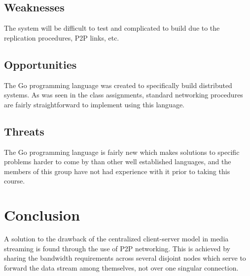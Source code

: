 \documentclass[fleqn,24pt]{SelfArx} %
\begin{document}
\subsection{Weaknesses}
The system will be difficult to test and complicated to build due to the replication procedures, P2P links, etc.

\subsection{Opportunities}
The Go programming language was created to specifically build distributed systems. As was seen in the class assignments, standard networking procedures are fairly straightforward to implement using this language. 

\subsection{Threats}
The Go programming language is fairly new which makes solutions to specific problems harder to come by than other well established languages, and the members of this group have not had experience with it prior to taking this course. 

\section{Conclusion}

A solution to the drawback of the centralized client-server model in media streaming is found through the use of P2P networking. This is achieved by sharing the bandwidth requirements across several disjoint nodes which serve to forward the data stream among themselves, not over one singular connection. 




\end{document}
